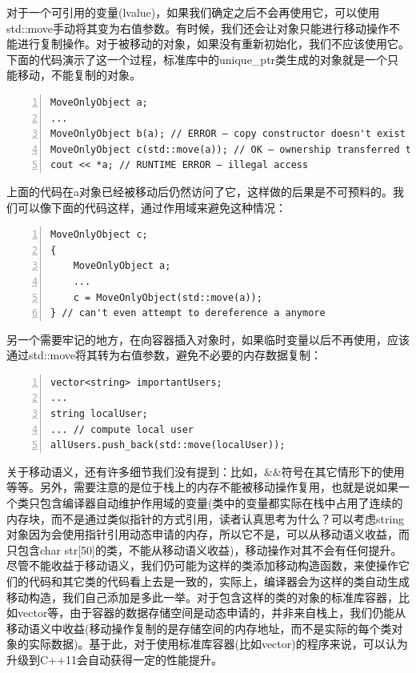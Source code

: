 \documentclass{ctexart}
\begin{document}
对于一个可引用的变量(lvalue)，如果我们确定之后不会再使用它，可以使用std::move手动将其变为右值参数。有时候，我们还会让对象只能进行移动操作不能进行复制操作。对于被移动的对象，如果没有重新初始化，我们不应该使用它。下面的代码演示了这一个过程，标准库中的unique\_ptr类生成的对象就是一个只能移动，不能复制的对象。

\begin{lstlisting}[language={[ANSI]C},keywordstyle=\color{blue!70},commentstyle=\color{red!50!green!50!blue!50},frame=shadowbox, rulesepcolor=\color{red!20!green!20!blue!20},basicstyle=\small,numbers=left, numberstyle=\tiny,breaklines=true]
MoveOnlyObject a;
...  
MoveOnlyObject b(a); // ERROR – copy constructor doesn't exist
MoveOnlyObject c(std::move(a)); // OK – ownership transferred to c. a is DEAD now  
cout << *a; // RUNTIME ERROR – illegal access
\end{lstlisting}

上面的代码在a对象已经被移动后仍然访问了它，这样做的后果是不可预料的。我们可以像下面的代码这样，通过作用域来避免这种情况：

\begin{lstlisting}[language={[ANSI]C},keywordstyle=\color{blue!70},commentstyle=\color{red!50!green!50!blue!50},frame=shadowbox, rulesepcolor=\color{red!20!green!20!blue!20},basicstyle=\small,numbers=left, numberstyle=\tiny,breaklines=true]
MoveOnlyObject c;
{    
	MoveOnlyObject a;
	...
	c = MoveOnlyObject(std::move(a));
} // can't even attempt to dereference a anymore
\end{lstlisting}

另一个需要牢记的地方，在向容器插入对象时，如果临时变量以后不再使用，应该通过std::move将其转为右值参数，避免不必要的内存数据复制：

\begin{lstlisting}[language={[ANSI]C},keywordstyle=\color{blue!70},commentstyle=\color{red!50!green!50!blue!50},frame=shadowbox, rulesepcolor=\color{red!20!green!20!blue!20},basicstyle=\small,numbers=left, numberstyle=\tiny,breaklines=true]
vector<string> importantUsers;  
...  
string localUser;  
... // compute local user  
allUsers.push_back(std::move(localUser));
\end{lstlisting}

关于移动语义，还有许多细节我们没有提到：比如，\&\&符号在其它情形下的使用等等。另外，需要注意的是位于栈上的内存不能被移动操作复用，也就是说如果一个类只包含编译器自动维护作用域的变量(类中的变量都实际在栈中占用了连续的内存块，而不是通过类似指针的方式引用，读者认真思考为什么？可以考虑string对象因为会使用指针引用动态申请的内存，所以它不是，可以从移动语义收益，而只包含char str[50]的类，不能从移动语义收益)，移动操作对其不会有任何提升。尽管不能收益于移动语义，我们仍可能为这样的类添加移动构造函数，来使操作它们的代码和其它类的代码看上去是一致的，实际上，编译器会为这样的类自动生成移动构造，我们自己添加是多此一举。对于包含这样的类的对象的标准库容器，比如vector等，由于容器的数据存储空间是动态申请的，并非来自栈上，我们仍能从移动语义中收益(移动操作复制的是存储空间的内存地址，而不是实际的每个类对象的实际数据)。基于此，对于使用标准库容器(比如vector)的程序来说，可以认为升级到C++11会自动获得一定的性能提升。
\end{document}
